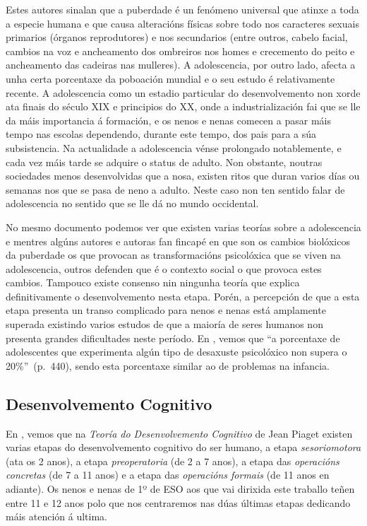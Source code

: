 Estes autores sinalan que a puberdade é un fenómeno universal que atinxe a toda a especie humana e que causa alteracións físicas sobre todo nos caracteres sexuais primarios (órganos reprodutores) e nos secundarios (entre outros, cabelo facial, cambios na voz e ancheamento dos ombreiros nos homes e crecemento do peito e ancheamento das cadeiras nas mulleres). A adolescencia, por outro lado, afecta a unha certa porcentaxe da poboación mundial e o seu estudo é relativamente recente. A adolescencia como un estadio particular do desenvolvemento non xorde ata finais do século XIX e principios do XX, onde a industrialización fai que se lle da máis importancia á formación, e os nenos e nenas comecen a pasar máis tempo nas escolas dependendo, durante este tempo, dos pais para a súa subsistencia. Na actualidade a adolescencia vénse prolongado notablemente, e cada vez máis tarde se adquire o status de adulto. Non obstante, noutras sociedades menos desenvolvidas que a nosa, existen ritos que duran varios días ou semanas nos que se pasa de neno a adulto. Neste caso non ten sentido falar de adolescencia no sentido que se lle dá no mundo occidental.

No mesmo documento podemos ver que existen varias teorías sobre a adolescencia e mentres algúns autores e autoras fan fincapé en que son os cambios biolóxicos da puberdade os que provocan as transformacións psicolóxica que se viven na adolescencia, outros defenden que é o contexto social o que provoca estes cambios. Tampouco existe consenso nin ningunha teoría que explica definitivamente o desenvolvemento nesta etapa. Porén, a percepción de que a esta etapa presenta un transo complicado para nenos e nenas está amplamente superada existindo varios estudos de que a maioría de seres humanos non presenta grandes dificultades neste período. En , vemos que ``a porcentaxe de adolescentes que experimenta algún tipo de desaxuste psicolóxico non supera o 20\%''~(p.~440), sendo esta porcentaxe similar ao de problemas na infancia.

\subsection{Desenvolvemento Cognitivo}
En , vemos que na \emph{Teoría do Desenvolvemento Cognitivo} de Jean Piaget existen varias etapas do desenvolvemento cognitivo do ser humano, a etapa \emph{sesoriomotora} (ata os 2 anos), a etapa \emph{preoperatoria} (de 2 a 7 anos), a etapa das \emph{operacións concretas} (de 7 a 11 anos) e a etapa das \emph{operacións formais} (de 11 anos en adiante). Os nenos e nenas de 1º de ESO aos que vai dirixida este traballo teñen entre 11 e 12 anos polo que nos centraremos nas dúas últimas etapas dedicando máis atención á ultima.


